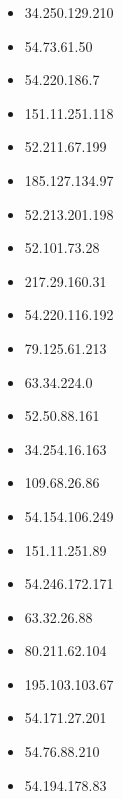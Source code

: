 \documentclass{article}
\begin{document}
\begin{itemize}
        \item 34.250.129.210
    
        \item 54.73.61.50
    
        \item 54.220.186.7
    
        \item 151.11.251.118
    
        \item 52.211.67.199
    
        \item 185.127.134.97
    
        \item 52.213.201.198
    
        \item 52.101.73.28
    
        \item 217.29.160.31
    
        \item 54.220.116.192
    
        \item 79.125.61.213
    
        \item 63.34.224.0
    
        \item 52.50.88.161
    
        \item 34.254.16.163
    
        \item 109.68.26.86
    
        \item 54.154.106.249
    
        \item 151.11.251.89
    
        \item 54.246.172.171
    
        \item 63.32.26.88
    
        \item 80.211.62.104
    
        \item 195.103.103.67
    
        \item 54.171.27.201
    
        \item 54.76.88.210
    
        \item 54.194.178.83
    

\end{itemize}
\end{document}
